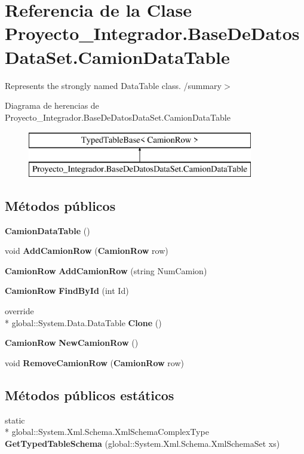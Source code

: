 \section{Referencia de la Clase Proyecto\-\_\-\-Integrador.\-Base\-De\-Datos\-Data\-Set.\-Camion\-Data\-Table}
\label{class_proyecto___integrador_1_1_base_de_datos_data_set_1_1_camion_data_table}


Represents the strongly named Data\-Table class. /summary$>$  


Diagrama de herencias de Proyecto\-\_\-\-Integrador.\-Base\-De\-Datos\-Data\-Set.\-Camion\-Data\-Table\begin{figure}[H]
\begin{center}
\leavevmode
\includegraphics[height=2.000000cm]{class_proyecto___integrador_1_1_base_de_datos_data_set_1_1_camion_data_table}
\end{center}
\end{figure}
\subsection*{Métodos públicos}
\begin{DoxyCompactItemize}
\item 
{\bf Camion\-Data\-Table} ()
\item 
void {\bf Add\-Camion\-Row} ({\bf Camion\-Row} row)
\item 
{\bf Camion\-Row} {\bf Add\-Camion\-Row} (string Num\-Camion)
\item 
{\bf Camion\-Row} {\bf Find\-By\-Id} (int Id)
\item 
override \\*
global\-::\-System.\-Data.\-Data\-Table {\bf Clone} ()
\item 
{\bf Camion\-Row} {\bf New\-Camion\-Row} ()
\item 
void {\bf Remove\-Camion\-Row} ({\bf Camion\-Row} row)
\end{DoxyCompactItemize}
\subsection*{Métodos públicos estáticos}
\begin{DoxyCompactItemize}
\item 
static \\*
global\-::\-System.\-Xml.\-Schema.\-Xml\-Schema\-Complex\-Type {\bf Get\-Typed\-Table\-Schema} (global\-::\-System.\-Xml.\-Schema.\-Xml\-Schema\-Set xs)
\end{DoxyCompactItemize}

